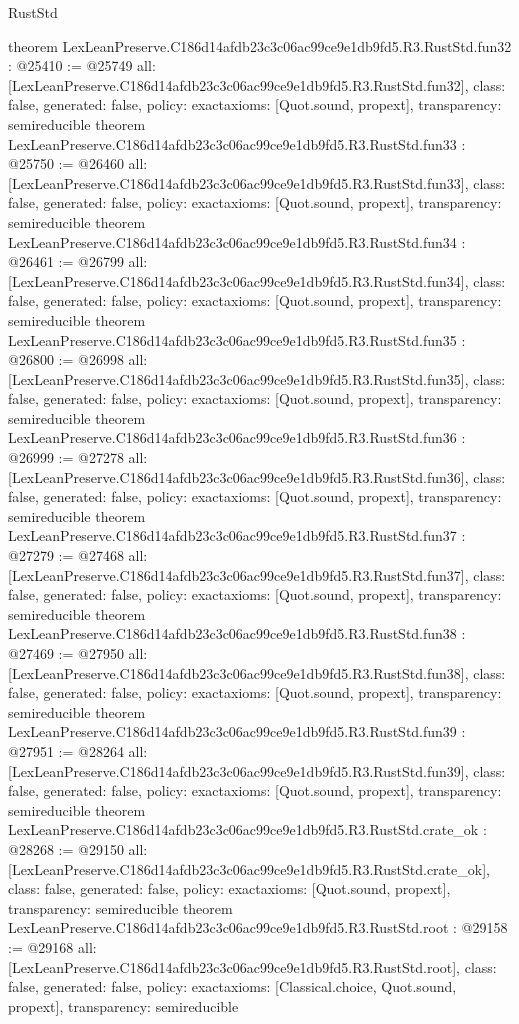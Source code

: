 \begin{lexlean}{RustStd}
\begin{coremodule}
{}
theorem LexLeanPreserve.C186d14afdb23c3c06ac99ce9e1db9fd5.R3.RustStd.fun32 : @25410 := @25749 {
  all: [LexLeanPreserve.C186d14afdb23c3c06ac99ce9e1db9fd5.R3.RustStd.fun32],
  class: false,
  generated: false,
  policy: exact{axioms: [Quot.sound, propext]},
  transparency: semireducible
}
theorem LexLeanPreserve.C186d14afdb23c3c06ac99ce9e1db9fd5.R3.RustStd.fun33 : @25750 := @26460 {
  all: [LexLeanPreserve.C186d14afdb23c3c06ac99ce9e1db9fd5.R3.RustStd.fun33],
  class: false,
  generated: false,
  policy: exact{axioms: [Quot.sound, propext]},
  transparency: semireducible
}
theorem LexLeanPreserve.C186d14afdb23c3c06ac99ce9e1db9fd5.R3.RustStd.fun34 : @26461 := @26799 {
  all: [LexLeanPreserve.C186d14afdb23c3c06ac99ce9e1db9fd5.R3.RustStd.fun34],
  class: false,
  generated: false,
  policy: exact{axioms: [Quot.sound, propext]},
  transparency: semireducible
}
theorem LexLeanPreserve.C186d14afdb23c3c06ac99ce9e1db9fd5.R3.RustStd.fun35 : @26800 := @26998 {
  all: [LexLeanPreserve.C186d14afdb23c3c06ac99ce9e1db9fd5.R3.RustStd.fun35],
  class: false,
  generated: false,
  policy: exact{axioms: [Quot.sound, propext]},
  transparency: semireducible
}
theorem LexLeanPreserve.C186d14afdb23c3c06ac99ce9e1db9fd5.R3.RustStd.fun36 : @26999 := @27278 {
  all: [LexLeanPreserve.C186d14afdb23c3c06ac99ce9e1db9fd5.R3.RustStd.fun36],
  class: false,
  generated: false,
  policy: exact{axioms: [Quot.sound, propext]},
  transparency: semireducible
}
theorem LexLeanPreserve.C186d14afdb23c3c06ac99ce9e1db9fd5.R3.RustStd.fun37 : @27279 := @27468 {
  all: [LexLeanPreserve.C186d14afdb23c3c06ac99ce9e1db9fd5.R3.RustStd.fun37],
  class: false,
  generated: false,
  policy: exact{axioms: [Quot.sound, propext]},
  transparency: semireducible
}
theorem LexLeanPreserve.C186d14afdb23c3c06ac99ce9e1db9fd5.R3.RustStd.fun38 : @27469 := @27950 {
  all: [LexLeanPreserve.C186d14afdb23c3c06ac99ce9e1db9fd5.R3.RustStd.fun38],
  class: false,
  generated: false,
  policy: exact{axioms: [Quot.sound, propext]},
  transparency: semireducible
}
theorem LexLeanPreserve.C186d14afdb23c3c06ac99ce9e1db9fd5.R3.RustStd.fun39 : @27951 := @28264 {
  all: [LexLeanPreserve.C186d14afdb23c3c06ac99ce9e1db9fd5.R3.RustStd.fun39],
  class: false,
  generated: false,
  policy: exact{axioms: [Quot.sound, propext]},
  transparency: semireducible
}
theorem LexLeanPreserve.C186d14afdb23c3c06ac99ce9e1db9fd5.R3.RustStd.crate_ok : @28268 := @29150 {
  all: [LexLeanPreserve.C186d14afdb23c3c06ac99ce9e1db9fd5.R3.RustStd.crate_ok],
  class: false,
  generated: false,
  policy: exact{axioms: [Quot.sound, propext]},
  transparency: semireducible
}
theorem LexLeanPreserve.C186d14afdb23c3c06ac99ce9e1db9fd5.R3.RustStd.root : @29158 := @29168 {
  all: [LexLeanPreserve.C186d14afdb23c3c06ac99ce9e1db9fd5.R3.RustStd.root],
  class: false,
  generated: false,
  policy: exact{axioms: [Classical.choice, Quot.sound, propext]},
  transparency: semireducible
}


\end{coremodule}
\end{lexlean}
